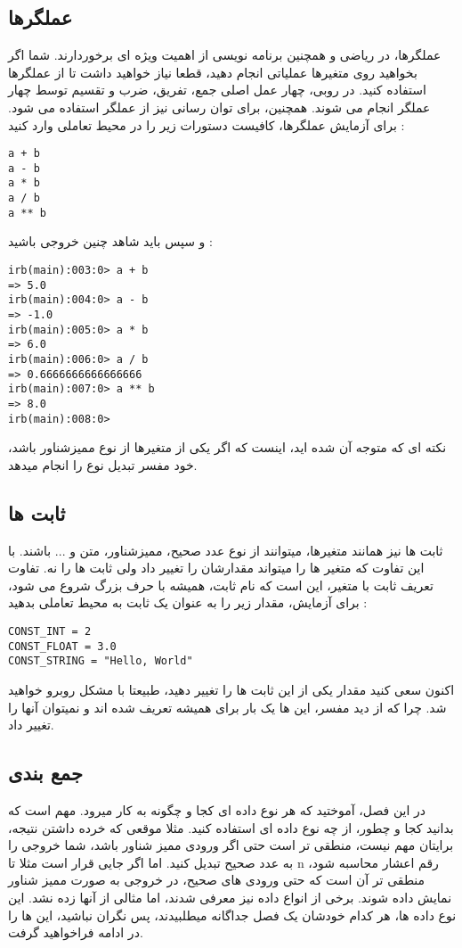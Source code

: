 \documentclass[11pt]{article}
\begin{document}
\subsection{عملگرها}
عملگرها، در ریاضی و همچنین برنامه نویسی از اهمیت ویژه ای برخوردارند. شما اگر بخواهید روی متغیرها عملیاتی انجام دهید، قطعا نیاز خواهید داشت تا از عملگرها استفاده کنید. در روبی، چهار عمل اصلی جمع، تفریق، ضرب و تقسیم توسط چهار عملگر
\lr{+, -, *, /}
انجام می شوند. همچنین، برای توان رسانی نیز از عملگر
\lr{**}
استفاده می شود. برای آزمایش عملگرها، کافیست دستورات زیر را در محیط تعاملی وارد کنید :
\begin{latin}
\begin{verbatim}
a + b 
a - b
a * b
a / b
a ** b
\end{verbatim}
\end{latin}
و سپس باید شاهد چنین خروجی باشید : 
\begin{latin}
\begin{verbatim}
irb(main):003:0> a + b
=> 5.0
irb(main):004:0> a - b
=> -1.0
irb(main):005:0> a * b
=> 6.0
irb(main):006:0> a / b
=> 0.6666666666666666
irb(main):007:0> a ** b
=> 8.0
irb(main):008:0> 
\end{verbatim}
\end{latin}
نکته ای که متوجه آن شده اید، اینست که اگر یکی از متغیرها از نوع ممیزشناور باشد، خود مفسر تبدیل نوع را انجام میدهد. 
\subsection{ثابت ها}
ثابت ها نیز همانند متغیرها، میتوانند از نوع عدد صحیح، ممیزشناور، متن و ... باشند. با این تفاوت که متغیر ها را میتواند مقدارشان را تغییر داد ولی ثابت ها را نه. تفاوت تعریف ثابت با متغیر، این است که نام ثابت، همیشه با حرف بزرگ شروع می شود، برای آزمایش، مقدار زیر را به عنوان یک ثابت به محیط تعاملی بدهید :
\begin{latin}
\begin{verbatim}
CONST_INT = 2
CONST_FLOAT = 3.0
CONST_STRING = "Hello, World"
\end{verbatim}
\end{latin}
اکنون سعی کنید مقدار یکی از این ثابت ها را تغییر دهید، طبیعتا با مشکل روبرو خواهید شد. چرا که از دید مفسر، این ها یک بار برای همیشه تعریف شده اند و نمیتوان آنها را تغییر داد. 

\subsection{جمع بندی}
در این فصل، آموختید که هر نوع داده ای کجا و چگونه به کار میرود. مهم است که بدانید کجا و چطور، از چه نوع داده ای استفاده کنید. مثلا موقعی که خرده داشتن نتیجه، برایتان مهم نیست، منطقی تر است حتی اگر ورودی ممیز شناور باشد، شما خروجی را به عدد صحیح تبدیل کنید. اما اگر جایی قرار است مثلا تا n رقم اعشار محاسبه شود، منطقی تر آن است که حتی ورودی های صحیح، در خروجی به صورت ممیز شناور نمایش داده شوند. برخی از انواع داده نیز معرفی شدند، اما مثالی از آنها زده نشد. این نوع داده ها، هر کدام خودشان یک فصل جداگانه میطلبیدند، پس نگران نباشید، این ها را در ادامه فراخواهید گرفت.
\end{document}
